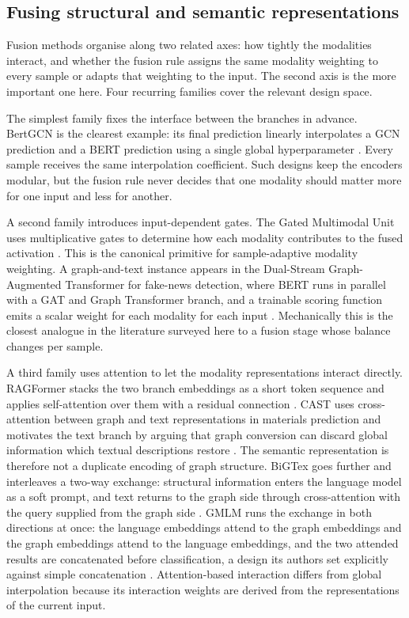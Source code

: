 \subsection{Fusing structural and semantic representations}

Fusion methods organise along two related axes: how tightly the modalities interact, and
whether the fusion rule assigns the same modality weighting to every sample or adapts that
weighting to the input. The second axis is the more important one here. Four recurring
families cover the relevant design space.

The simplest family fixes the interface between the branches in advance. BertGCN is the
clearest example: its final prediction linearly interpolates a GCN prediction and a BERT
prediction using a single global hyperparameter \citep{lin2021bertgcn}. Every sample receives
the same interpolation coefficient. Such designs keep the encoders modular, but the fusion
rule never decides that one modality should matter more for one input and less for another.

A second family introduces input-dependent gates. The Gated Multimodal Unit uses
multiplicative gates to determine how each modality contributes to the fused activation
\citep{arevalo2017gmu}. This is the canonical primitive for sample-adaptive modality
weighting. A graph-and-text instance appears in the Dual-Stream Graph-Augmented Transformer
for fake-news detection, where BERT runs in parallel with a GAT and Graph Transformer branch,
and a trainable scoring function emits a scalar weight for each modality for each input
\citep{moorthy2025dualstream}. Mechanically this is the closest analogue in the literature
surveyed here to a fusion stage whose balance changes per sample.

A third family uses attention to let the modality representations interact directly.
RAGFormer stacks the two branch embeddings as a short token sequence and applies
self-attention over them with a residual connection \citep{li2024ragformer}. CAST uses
cross-attention between graph and text representations in materials prediction and motivates
the text branch by arguing that graph conversion can discard global information which
textual descriptions restore \citep{lee2025cast}. The semantic representation is therefore
not a duplicate encoding of graph structure. BiGTex goes further and interleaves a two-way
exchange: structural information enters the language model as a soft prompt, and text
returns to the graph side through cross-attention with the query supplied from the graph
side \citep{beiranvand2026bigtex}. GMLM runs the exchange in both directions at once: the
language embeddings attend to the graph embeddings and the graph embeddings attend to the
language embeddings, and the two attended results are concatenated before classification, a
design its authors set explicitly against simple concatenation \citep{sinha2025gmlm}.
Attention-based interaction differs from global interpolation because its interaction weights
are derived from the representations of the current input.


